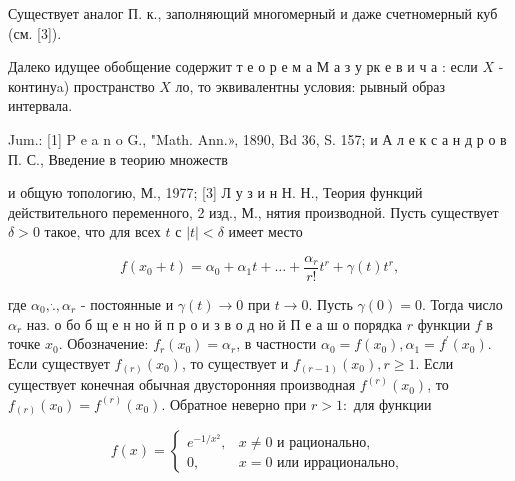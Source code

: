 \documentclass[10pt]{article}
\begin{document}
Существует аналог П. к., заполняющий многомерный и даже счетномерный куб (см. [3]).



Далеко идущее обобщение содержит т е о р е м а М а з у рк е в и ч а : если $X$ - континуa) пространство $X$ ло, то эквивалентны условия: рывный образ интервала.



Jum.: [1] P e a n o G., "Math. Ann.», 1890, Bd 36, S. 157; и А л е к с а н д р о в П. С., Введение в теорию множеств

и общую топологию, М., 1977; [3] Л у з и н Н. Н., Теория функций действительного переменного, 2 изд., М., нятия производной. Пусть существует $\delta>0$ такое, что для всех $t$ с $|t|<\delta$ имеет место



\[

f\left(x_{0}+t\right)=\alpha_{0}+\alpha_{1} t+\ldots+\frac{\alpha_{r}}{r !} t^{r}+\gamma(t) t^{r},

\]



где $\alpha_{0}, \dot{.}, \alpha_{r}$ - постоянные и $\gamma(t) \rightarrow 0$ при $t \rightarrow 0$. Пусть $\gamma(0)=0$. Тогда число $\alpha_{r}$ наз. о бо б щ е н но й п р о и з в о д но й П е а ш о порядка $r$ функции $f$ в точке $x_{0}$. Обозначение: $f_{r}\left(x_{0}\right)=\alpha_{r}$, в частности $\alpha_{0}=f\left(x_{0}\right), \alpha_{1}=f^{\prime}\left(x_{0}\right)$. Если существует $f_{(r)}\left(x_{0}\right)$, то существует и $f_{(r-1)}\left(x_{0}\right), r \geqslant 1$. Если существует конечная обычная двусторонняя производная $f^{(r)}\left(x_{0}\right)$, то $f_{(r)}\left(x_{0}\right)=f^{(r)}\left(x_{0}\right)$. Обратное неверно при $r>1:$ для функции



\[

f(x)= \begin{cases}e^{-1 / x^{2}}, & x \neq 0 \text { и рационально, } \\ 0, & x=0 \text { или иррационально, }\end{cases}

\]
\end{document}
